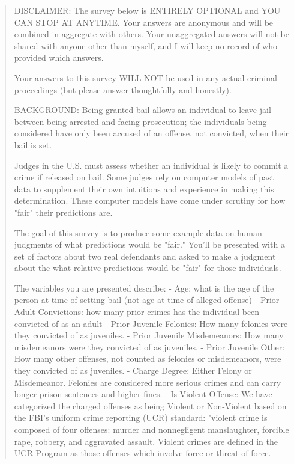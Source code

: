     \begin{quote}
        DISCLAIMER: The survey below is ENTIRELY OPTIONAL and YOU CAN STOP AT ANYTIME.  Your answers are anonymous and will be combined in aggregate with others.  Your unaggregated answers will not be shared with anyone other than myself, and I will keep no record of who provided which answers.

        Your answers to this survey WILL NOT be used in any actual criminal proceedings (but please answer thoughtfully and honestly).
        
        BACKGROUND: Being granted bail allows an individual to leave jail between being arrested and facing prosecution; the individuals being considered have only been accused of an offense, not convicted, when their bail is set.

        Judges in the U.S. must assess whether an individual is likely to commit a crime if released on bail.  Some judges rely on computer models of past data to supplement their own intuitions and experience in making this determination.  These computer models have come under scrutiny for how "fair" their predictions are.

        The goal of this survey is to produce some example data on human judgments of what predictions would be "fair."  You'll be presented with a set of factors about two real defendants and asked to make a judgment about the what relative predictions would be "fair" for those individuals.
        
        The variables you are presented describe:
        - Age: what is the age of the person at time of setting bail (not age at time of alleged offense)
        - Prior Adult Convictions: how many prior crimes has the individual been convicted of as an adult
        - Prior Juvenile Felonies: How many felonies were they convicted of as juveniles.
        - Prior Juvenile Misdemeanors: How many misdemeanors were they convicted of as juveniles.
        - Prior Juvenile Other: How many other offenses, not counted as felonies or misdemeanors, were they convicted of as juveniles.
        - Charge Degree: Either Felony or Misdemeanor.  Felonies are considered more serious crimes and can carry longer prison sentences and higher fines.
        - Is Violent Offense: We have categorized the charged offenses as being Violent or Non-Violent based on the FBI's uniform crime reporting (UCR) standard: "violent crime is composed of four offenses: murder and nonnegligent manslaughter, forcible rape, robbery, and aggravated assault. Violent crimes are defined in the UCR Program as those offenses which involve force or threat of force.
        

\end{quote}
